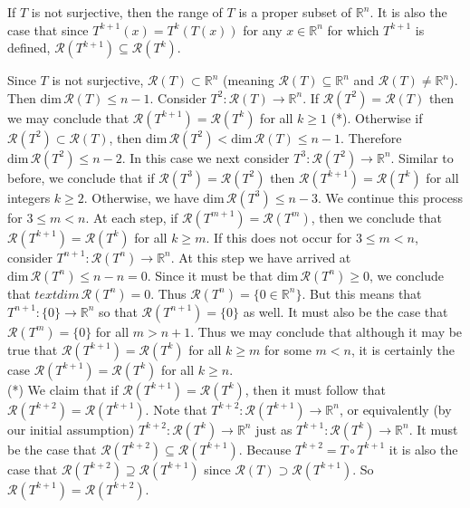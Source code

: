 \documentclass[11pt]{article}
\begin{document}
If $T$ is not surjective, then the range of $T$ is a proper subset of $\mathbb{R}^n$. It is also the case that since $T^{k+1}(x) = T^k(T(x))$ for any $x \in \mathbb{R}^n$ for which $T^{k+1}$ is defined, $\mathcal{R}(T^{k+1}) \subseteq \mathcal{R}(T^k)$.

Since $T$ is not surjective, $\mathcal{R}(T) \subset \mathbb{R}^n$ (meaning $\mathcal{R}(T) \subseteq \mathbb{R}^n$ and $\mathcal{R}(T) \neq \mathbb{R}^n$). Then $\text{dim} \, \mathcal{R}(T) \leq n-1$. Consider $T^2 : \mathcal{R}(T) \rightarrow \mathbb{R}^n$. If $\mathcal{R}(T^2) = \mathcal{R}(T)$ then we may conclude that $\mathcal{R}(T^{k+1}) = \mathcal{R}(T^k)$ for all $k \geq 1$ (*). Otherwise if $\mathcal{R}(T^2) \subset \mathcal{R}(T)$, then $\text{dim} \, \mathcal{R}(T^2) < \text{dim} \, \mathcal{R}(T) \leq n-1$. Therefore $\text{dim} \, \mathcal{R}(T^2) \leq n-2$. In this case we next consider $T^3 : \mathcal{R}(T^2) \rightarrow \mathbb{R}^n$. Similar to before, we conclude that if $\mathcal{R}(T^3) = \mathcal{R}(T^2)$ then $\mathcal{R}(T^{k+1}) = \mathcal{R}(T^k)$ for all integers $k \geq 2$. Otherwise, we have $\text{dim} \, \mathcal{R}(T^3) \leq n-3$. We continue this process for $3 \leq m < n$. At each step, if $\mathcal{R}(T^{m+1}) = \mathcal{R}(T^{m})$, then we conclude that $\mathcal{R}(T^{k+1}) = \mathcal{R}(T^{k})$ for all $k \geq m$. If this does not occur for $3 \leq m < n$, consider $T^{n+1} : \mathcal{R}(T^n) \rightarrow \mathbb{R}^n$. At this step we have arrived at $\text{dim} \, \mathcal{R}(T^n) \leq n-n = 0$. Since it must be that $\text{dim} \, \mathcal{R}(T^n)\geq 0$, we conclude that $text{dim} \, \mathcal{R}(T^n) = 0$. Thus $\mathcal{R}(T^n) = \{0 \in \mathbb{R}^n\}$. But this means that $T^{n+1} : \{0\} \rightarrow \mathbb{R}^n$ so that $\mathcal{R}(T^{n+1}) = \{0\}$ as well. It must also be the case that $\mathcal{R}(T^{m}) = \{0\}$ for all $m >n+1$. Thus we may conclude that although it may be true that $\mathcal{R}(T^{k+1}) = \mathcal{R}(T^k)$ for all $k \geq m$ for some $m < n$, it is certainly the case $\mathcal{R}(T^{k+1}) = \mathcal{R}(T^k)$ for all $k \geq n$. \\

(*) We claim that if $\mathcal{R}(T^{k+1}) = \mathcal{R}(T^k)$, then it must follow that $\mathcal{R}(T^{k+2}) = \mathcal{R}(T^{k+1})$. Note that $T^{k+2} : \mathcal{R}(T^{k+1}) \rightarrow \mathbb{R}^n$, or equivalently (by our initial assumption) $T^{k+2} : \mathcal{R}(T^{k}) \rightarrow \mathbb{R}^n$ just as $T^{k+1} : \mathcal{R}(T^k) \rightarrow \mathbb{R}^n$. It must be the case that $\mathcal{R}(T^{k+2}) \subseteq \mathcal{R}(T^{k+1})$. Because $T^{k+2} = T\circ T^{k+1}$ it is also the case that $\mathcal{R}(T^{k+2}) \supseteq \mathcal{R}(T^{k+1})$ since $\mathcal{R}(T) \supset \mathcal{R}(T^{k+1})$. So $\mathcal{R}(T^{k+1}) = \mathcal{R}(T^{k+2})$.  
\end{document}

